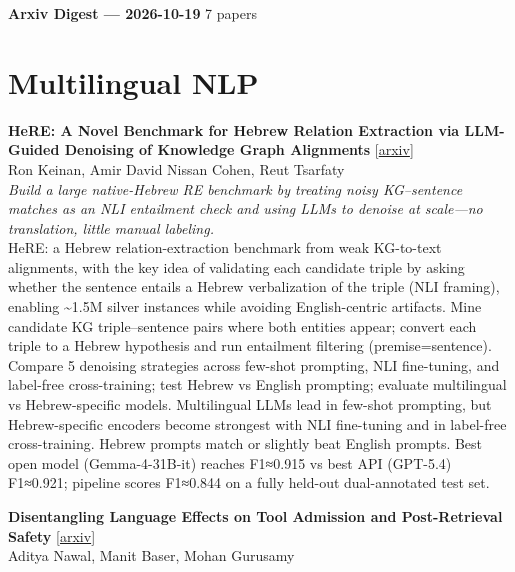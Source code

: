 \documentclass[12pt,letterpaper]{article}
\begin{document}
{\footnotesize\textbf{Arxiv Digest --- 2026-10-19} \hfill 7 papers}

\smallskip

\section*{Multilingual NLP}

{\small\textbf{HeRE: A Novel Benchmark for Hebrew Relation Extraction via LLM-Guided Denoising of Knowledge Graph Alignments}} {\scriptsize[\href{https://arxiv.org/abs/2610.22542}{arxiv}]}\\
{\scriptsize Ron Keinan, Amir David Nissan Cohen, Reut Tsarfaty}\\

{\small\textit{Build a large native-Hebrew RE benchmark by treating noisy KG--sentence matches as an NLI entailment check and using LLMs to denoise at scale---no translation, little manual labeling.}}\\[1pt]
{\footnotesize HeRE: a Hebrew relation-extraction benchmark from weak KG-to-text alignments, with the key idea of validating each candidate triple by asking whether the sentence entails a Hebrew verbalization of the triple (NLI framing), enabling \textasciitilde{}1.5M silver instances while avoiding English-centric artifacts. Mine candidate KG triple--sentence pairs where both entities appear; convert each triple to a Hebrew hypothesis and run entailment filtering (premise=sentence). Compare 5 denoising strategies across few-shot prompting, NLI fine-tuning, and label-free cross-training; test Hebrew vs English prompting; evaluate multilingual vs Hebrew-specific models. Multilingual LLMs lead in few-shot prompting, but Hebrew-specific encoders become strongest with NLI fine-tuning and in label-free cross-training. Hebrew prompts match or slightly beat English prompts. Best open model (Gemma-4-31B-it) reaches F1≈0.915 vs best API (GPT-5.4) F1≈0.921; pipeline scores F1≈0.844 on a fully held-out dual-annotated test set.}

\medskip

{\small\textbf{Disentangling Language Effects on Tool Admission and Post-Retrieval Safety}} {\scriptsize[\href{https://arxiv.org/abs/2610.23093}{arxiv}]}\\
{\scriptsize Aditya Nawal, Manit Baser, Mohan Gurusamy}\\
\end{document}
